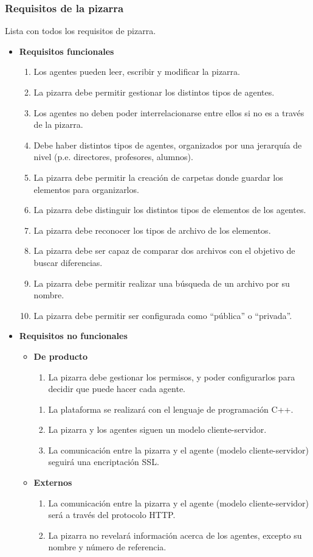 \subsubsection{Requisitos de la pizarra}\label{reqdiseñopiz}
Lista con todos los requisitos de pizarra.
\begin{itemize}
\item \textbf{Requisitos funcionales}
	\begin{enumerate}
		\item Los agentes pueden leer, escribir y modificar la pizarra.
		\item La pizarra debe permitir gestionar los distintos tipos de agentes.
		\item Los agentes no deben poder interrelacionarse entre ellos si no es a través de la pizarra.
		\item Debe haber distintos tipos de agentes, organizados por una jerarquía de nivel (p.e. directores, profesores, alumnos).
		\item La pizarra debe permitir la creación de carpetas donde guardar los elementos para organizarlos.
		\item La pizarra debe distinguir los distintos tipos de elementos de los agentes.
		\item La pizarra debe reconocer los tipos de archivo de los elementos.
		\item La pizarra debe ser capaz de comparar dos archivos con el objetivo de buscar diferencias.
		\item La pizarra debe permitir realizar una búsqueda de un archivo por su nombre.
		\item La pizarra debe permitir ser configurada como ``pública'' o ``privada''.
	\end{enumerate}
\item \textbf{Requisitos no funcionales}
		\begin{itemize}
			\item \textbf{De producto}
	\begin{enumerate}
		\item La pizarra debe gestionar los permisos, y poder configurarlos para decidir que puede hacer cada agente.
	\end{enumerate}
	\begin{enumerate}
		\item La plataforma se realizará con el lenguaje de programación C++.
		\item La pizarra y los agentes siguen un modelo cliente-servidor.
		\item La comunicación entre la pizarra y el agente (modelo cliente-servidor) seguirá una encriptación SSL.
	\end{enumerate}
			\item \textbf{Externos}
	\begin{enumerate}
		\item La comunicación entre la pizarra y el agente (modelo cliente-servidor) será a través del protocolo HTTP.
		\item La pizarra no revelará información acerca de los agentes, excepto su nombre y número de referencia.
	\end{enumerate}
		\end{itemize}
\end{itemize}

